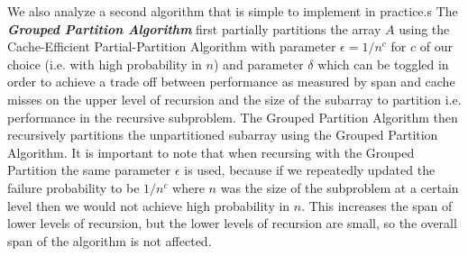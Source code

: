 \documentclass[sigconf]{acmart}
\newcommand{\defn}[1]       {{\textit{\textbf{\boldmath #1}}}}
\theoremstyle{remark}
\theoremstyle{remark}
\begin{document}
We also analyze a second algorithm that is simple to implement in practice.s
The \defn{Grouped Partition Algorithm} first partially partitions the array $A$ using the Cache-Efficient Partial-Partition Algorithm with parameter $\epsilon = 1/n^c$ for $c$ of our choice (i.e. with high probability in $n$) and parameter $\delta $ which can be toggled in order to achieve a trade off between performance as measured by span and cache misses on the upper level of recursion and the size of the subarray to partition i.e. performance in the recursive subproblem. 
The Grouped Partition Algorithm then recursively partitions the unpartitioned subarray using the Grouped Partition Algorithm. 
It is important to note that when recursing with the Grouped Partition the same parameter $\epsilon$ is used, because if we repeatedly updated the failure probability to be $1/n^c$ where $n$ was the size of the subproblem at a certain level then we would not achieve high probability in $n$. 
This increases the span of lower levels of recursion, but the lower levels of recursion are small, so the overall span of the algorithm is not affected.
\end{document}
